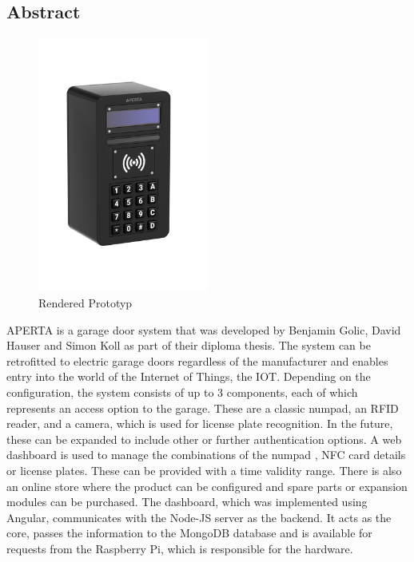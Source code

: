\begin{spacing}{1}
  \chapter*{Abstract}
\end{spacing}
\begin{figure}
  \begin{center}
    \includegraphics[width=0.5\textwidth]{pics/all-in-package.png}
    \caption{Rendered Prototyp}
  \end{center}
\end{figure}
APERTA is a garage door system that was developed by Benjamin Golic, David Hauser and Simon Koll as part of their diploma thesis. The system can be retrofitted to electric garage doors regardless of the manufacturer and enables entry into the world of the Internet of Things, the IOT. Depending on the configuration, the system consists of up to 3 components, each of which represents an access option to the garage. These are a classic numpad, an RFID reader, and a camera, which is used for license plate recognition. In the future, these can be expanded to include other or further authentication options. A web dashboard is used to manage the combinations of the numpad , NFC card details or license plates. These can be provided with a time validity range. There is also an online store where the product can be configured and spare parts or expansion modules can be purchased. The dashboard, which was implemented using Angular, communicates with the Node-JS server as the backend. It acts as the core, passes the information to the MongoDB database and is available for requests from the Raspberry Pi, which is responsible for the hardware.

